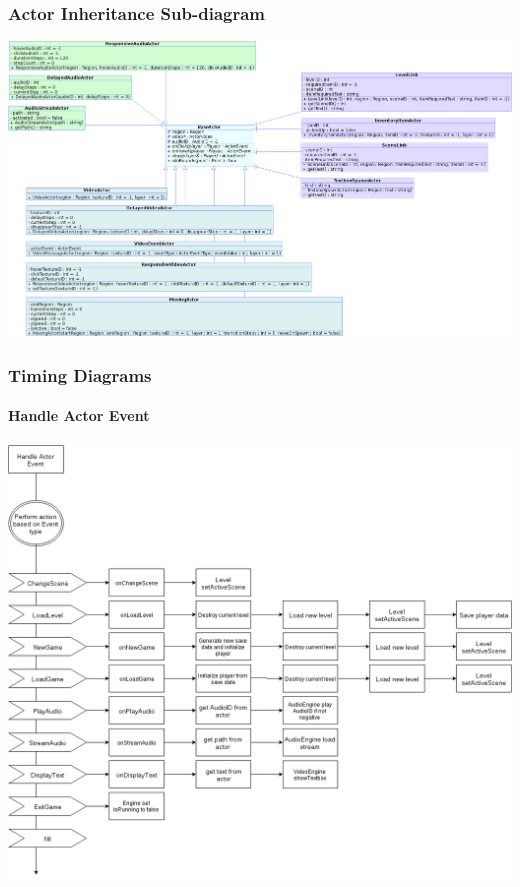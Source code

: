 \documentclass{article}
\begin{document}
		\subsubsection{Actor Inheritance Sub-diagram}
			\begin{center}
				\includegraphics[scale=0.51,angle=90]{Actors.png}
			\end{center}
		\subsubsection{Timing Diagrams}
			\paragraph{Handle Actor Event}
				\begin{center}
					\includegraphics[scale=0.48,angle=90]{handle-actor-event.png}
				\end{center}
\end{document}
